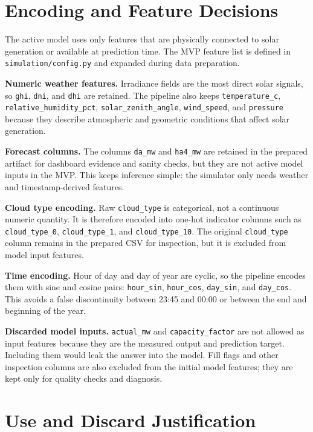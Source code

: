 \documentclass[paper=a4, fontsize=11pt]{scrartcl}
\numberwithin{table}{section}
\begin{document}
\section{Encoding and Feature Decisions}

The active model uses only features that are physically connected to solar
generation or available at prediction time. The MVP feature list is defined in
\texttt{simulation/config.py} and expanded during data preparation.

\textbf{Numeric weather features.} Irradiance fields are the most direct solar
signals, so \texttt{ghi}, \texttt{dni}, and \texttt{dhi} are retained. The
pipeline also keeps \texttt{temperature\_c}, \texttt{relative\_humidity\_pct},
\texttt{solar\_zenith\_angle}, \texttt{wind\_speed}, and \texttt{pressure}
because they describe atmospheric and geometric conditions that affect solar
generation.

\textbf{Forecast columns.} The columns \texttt{da\_mw} and \texttt{ha4\_mw}
are retained in the prepared artifact for dashboard evidence and sanity checks,
but they are not active model inputs in the MVP. This keeps inference simple:
the simulator only needs weather and timestamp-derived features.

\textbf{Cloud type encoding.} Raw \texttt{cloud\_type} is categorical, not a
continuous numeric quantity. It is therefore encoded into one-hot indicator
columns such as \texttt{cloud\_type\_0}, \texttt{cloud\_type\_1}, and
\texttt{cloud\_type\_10}. The original \texttt{cloud\_type} column remains in
the prepared CSV for inspection, but it is excluded from model input features.

\textbf{Time encoding.} Hour of day and day of year are cyclic, so the pipeline
encodes them with sine and cosine pairs: \texttt{hour\_sin},
\texttt{hour\_cos}, \texttt{day\_sin}, and \texttt{day\_cos}. This avoids a
false discontinuity between 23:45 and 00:00 or between the end and beginning of
the year.

\textbf{Discarded model inputs.} \texttt{actual\_mw} and
\texttt{capacity\_factor} are not allowed as input features because they are the
measured output and prediction target. Including them would leak the answer into
the model. Fill flags and other inspection columns are also excluded from the
initial model features; they are kept only for quality checks and diagnosis.

\section{Use and Discard Justification}
\end{document}

